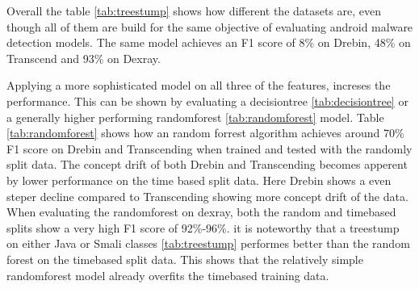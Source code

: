 Overall the table \ref{tab:treestump} shows how different the datasets are, 
even though all of them are build for the same objective of evaluating android malware detection models.
The same model achieves an F1 score of 8\% on Drebin, 48\% on Transcend and 93\% on Dexray.

\begin{table}[t]
    \caption{\label{tab:randomforest}%
    Random Forest (n\_estimators=300, max\_depth=25) results by dataset and split. Features include Java Classes, Smali Classes, and APK Size.}
\end{table}

Applying a more sophisticated model on all three of the features, increses the performance.
This can be shown by evaluating a decisiontree \ref{tab:decisiontree} or a generally higher performing randomforest \ref{tab:randomforest} model. 
Table \ref{tab:randomforest} shows how an random forrest algorithm achieves around 70\% F1 score on Drebin and Transcending when trained and tested with the randomly split data.
The concept drift of both Drebin and Transcending becomes apperent by lower performance on the time based split data.
Here Drebin shows a even steper decline compared to Transcending showing more concept drift of the data.
When evaluating the randomforest on dexray, both the random and timebased splits show a very high F1 score of 92\%-96\%.
it is noteworthy that a treestump on either Java or Smali classes \ref{tab:treestump} performes better than the random forest on the timebased split data.
This shows that the relatively simple randomforest model already overfits the timebased training data.

